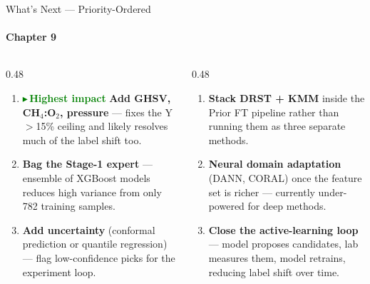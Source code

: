 \documentclass[aspectratio=169,12pt]{beamer}
\newcommand{\badge}[2]{%
  {\footnotesize\bfseries\textcolor{#1}{$\blacktriangleright$\,#2}}}
\begin{document}
\begin{frame}[allowframebreaks]{What's Next — Priority-Ordered}
  \framesubtitle{Chapter 9}

  \begin{columns}[T]

    \begin{column}{0.48\textwidth}
      \begin{enumerate}\footnotesize
        \item \badge{green}{Highest impact} \textbf{Add GHSV, CH$_4$:O$_2$,
          pressure} — fixes the Y$>$15\% ceiling and likely resolves much of
          the label shift too.
        \vspace{3pt}
        \item \textbf{Bag the Stage-1 expert} — ensemble of XGBoost models
          reduces high variance from only 782 training samples.
        \vspace{3pt}
        \item \textbf{Add uncertainty} (conformal prediction or quantile
          regression) — flag low-confidence picks for the experiment loop.
      \end{enumerate}
    \end{column}

    \begin{column}{0.48\textwidth}
      \begin{enumerate}\footnotesize
        \setcounter{enumi}{3}
        \item \textbf{Stack DRST + KMM} inside the Prior FT pipeline rather
          than running them as three separate methods.
        \vspace{3pt}
        \item \textbf{Neural domain adaptation} (DANN, CORAL) once the feature
          set is richer — currently under-powered for deep methods.
        \vspace{3pt}
        \item \textbf{Close the active-learning loop} — model proposes
          candidates, lab measures them, model retrains, reducing label shift
          over time.
      \end{enumerate}
    \end{column}

  \end{columns}

\end{frame}
\end{document}
